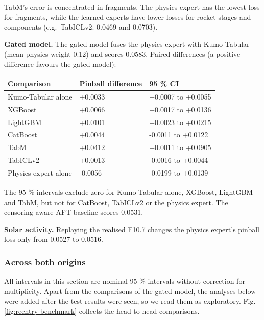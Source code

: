 \documentclass[
]{article}
\newcounter{none} %
\begin{document}
TabM's error is concentrated in fragments. The physics expert has the
lowest loss for fragments, while the learned experts have lower losses
for rocket stages and components (e.g.~TabICLv2: 0.0469 and 0.0703).

\textbf{Gated model.} The gated model fuses the physics expert with
Kumo-Tabular (mean physics weight 0.12) and scores 0.0583. Paired
differences (a positive difference favours the gated model):

{\def\LTcaptype{none} %
\begin{longtable}[]{@{}lll@{}}
\toprule\noalign{}
Comparison & Pinball difference & 95 \% CI \\
\midrule\noalign{}
\endhead
\bottomrule\noalign{}
\endlastfoot
Kumo-Tabular alone & +0.0033 & +0.0007 to +0.0055 \\
XGBoost & +0.0066 & +0.0017 to +0.0136 \\
LightGBM & +0.0101 & +0.0023 to +0.0215 \\
CatBoost & +0.0044 & -0.0011 to +0.0122 \\
TabM & +0.0412 & +0.0011 to +0.0905 \\
TabICLv2 & +0.0013 & -0.0016 to +0.0044 \\
Physics expert alone & -0.0056 & -0.0199 to +0.0139 \\
\end{longtable}
}

The 95 \% intervals exclude zero for Kumo-Tabular alone, XGBoost,
LightGBM and TabM, but not for CatBoost, TabICLv2 or the physics expert.
The censoring-aware AFT baseline scores 0.0531.

\textbf{Solar activity.} Replaying the realised F10.7 changes the
physics expert's pinball loss only from 0.0527 to 0.0516.

\subsubsection{Across both origins}\label{across-both-origins}

All intervals in this section are nominal 95 \% intervals without
correction for multiplicity. Apart from the comparisons of the gated
model, the analyses below were added after the test results were seen,
so we read them as exploratory. Fig. \ref{fig:reentry-benchmark}
collects the head-to-head comparisons.
\end{document}
